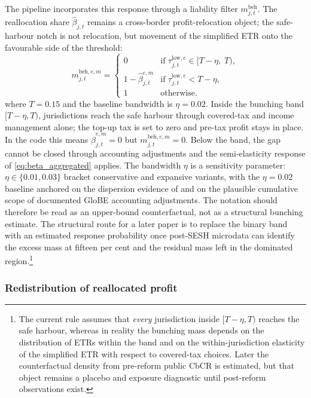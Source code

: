\documentclass[11pt,a4paper]{article}
\begin{document}
The pipeline incorporates this response through a liability filter $m_{j,t}^{\text{beh}}$. The reallocation share $\hat{\beta}_{j,t}$ remains a cross-border profit-relocation object; the safe-harbour notch is not relocation, but movement of the simplified ETR onto the favourable side of the threshold:
\begin{equation}\label{eq:regime}
m_{j,t}^{\text{beh},e,m} = \begin{cases}
0 & \text{if } \tau_{j,t}^{\text{low},e} \in [T - \eta,\; T), \\[2pt]
1-\hat{\beta}_{j,t}^{e,m} & \text{if } \tau_{j,t}^{\text{low},e} < T - \eta, \\[2pt]
1 & \text{otherwise.}
\end{cases}
\end{equation}
where $T = 0.15$ and the baseline bandwidth is $\eta = 0.02$. Inside the bunching band $[T-\eta, T)$, jurisdictions reach the safe harbour through covered-tax and income management alone; the top-up tax is set to zero and pre-tax profit stays in place. In the code this means $\hat{\beta}_{j,t}^{e,m}=0$ but $m_{j,t}^{\text{beh},e,m}=0$. Below the band, the gap cannot be closed through accounting adjustments and the semi-elasticity response of \eqref{eq:beta_aggregated} applies. The bandwidth $\eta$ is a sensitivity parameter: $\eta \in \{0.01, 0.03\}$ bracket conservative and expansive variants, with the $\eta = 0.02$ baseline anchored on the dispersion evidence of \citet{hugger2026} and on the plausible cumulative scope of documented GloBE accounting adjustments. The notation should therefore be read as an upper-bound counterfactual, not as a structural bunching estimate. The structural route for a later paper is to replace the binary band with an estimated response probability once post-SESH microdata can identify the excess mass at fifteen per cent and the residual mass left in the dominated region.\footnote{The current rule assumes that \emph{every} jurisdiction inside $[T-\eta,T)$ reaches the safe harbour, whereas in reality the bunching mass depends on the distribution of ETRs within the band and on the within-jurisdiction elasticity of the simplified ETR with respect to covered-tax choices. Later the counterfactual density from pre-reform public CbCR is estimated, but that object remains a placebo and exposure diagnostic until post-reform observations exist.}

\subsubsection{Redistribution of reallocated profit}\label{sec:reallocation}
\end{document}
